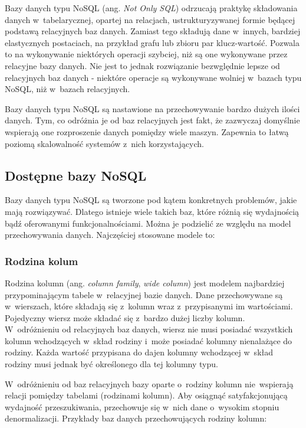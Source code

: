 Bazy danych typu NoSQL (ang. \emph{Not Only SQL}) odrzucają praktykę składowania danych w~tabelarycznej, opartej na relacjach, ustrukturyzywanej formie będącej podstawą relacyjnych baz danych.
Zamiast tego składują dane w~innych, bardziej elastycznych postaciach, na przykład grafu lub zbioru par klucz-wartość.
Pozwala to na wykonywanie niektórych operacji szybciej, niż są one wykonywane przez relacyjne bazy danych.
Nie jest to jednak rozwiązanie bezwględnie lepsze od relacyjnych baz danych - niektóre operacje są wykonywane wolniej w~bazach typu NoSQL, niż w~bazach relacyjnych.

Bazy danych typu NoSQL są nastawione na przechowywanie bardzo dużych ilości danych.
Tym, co odróżnia je od baz relacyjnych jest fakt, że zazwyczaj domyślnie wspierają one rozproszenie danych pomiędzy wiele maszyn.
Zapewnia to łatwą poziomą skalowalność systemów z~nich korzystających.


\subsection{Dostępne bazy NoSQL}

Bazy danych typu NoSQL są tworzone pod kątem konkretnych problemów, jakie mają rozwiązywać.
Dlatego istnieje wiele takich baz, które różnią się wydajnością bądź oferowanymi funkcjonalnościami.
Można je podzielić ze względu na model przechowywania danych.
Najczęściej stosowane modele to:

\subsubsection{Rodzina kolum}

Rodzina kolumn (ang. \emph{column family}, \emph{wide column}) jest modelem najbardziej przypominającym tabele w~relacyjnej bazie danych.
Dane przechowywane są w~wierszach, które składają się z~kolumn wraz z~przypisanymi im wartościami.
Pojedyczny wiersz może składać się z~bardzo dużej liczby kolumn.
W~odróżnieniu od relacyjnych baz danych, wiersz nie musi posiadać wszystkich kolumn wchodzących w~skład rodziny i~może posiadać kolumny nienalażące do rodziny.
Każda wartość przypisana do dajen kolumny wchodzącej w~skład rodziny musi jednak być określonego dla tej kolumny typu.

W~odróżnieniu od baz relacyjnych bazy oparte o~rodziny kolumn nie~wspierają relacji pomiędzy tabelami (rodzinami kolumn).
Aby osiągnąć satyfakcjonującą wydajność przeszukiwania, przechowuje się w~nich dane o~wysokim stopniu denormalizacji.
Przykłady baz danych przechowujących rodziny kolumn:

